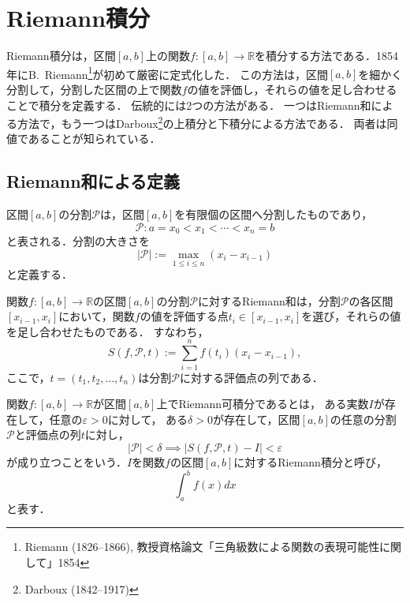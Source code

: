 \chapter{Riemann積分}


Riemann積分は，区間$[a,b]$上の関数$f : [a,b] \to \mathbb{R}$を積分する方法である．1854年にB.~Riemann\footnote{Riemann (1826--1866), 教授資格論文「三角級数による関数の表現可能性に関して」1854}が初めて厳密に定式化した．
この方法は，区間$[a,b]$を細かく分割して，分割した区間の上で関数$f$の値を評価し，それらの値を足し合わせることで積分を定義する．
伝統的には2つの方法がある．
一つはRiemann和による方法で，もう一つはDarboux\footnote{Darboux (1842--1917)}の上積分と下積分による方法である．
両者は同値であることが知られている．

\section{Riemann和による定義}
\begin{definition}[区間の分割]
    区間$[a,b]$の分割$\mathcal{P}$は，区間$[a,b]$を有限個の区間へ分割したものであり，
    \[
    \mathcal{P} : a = x_0 < x_1 < \cdots < x_n = b
    \]
    と表される．分割の大きさを
    \[ |\mathcal{P}| := \max_{1 \leq i \leq n} (x_i - x_{i-1})\]
    と定義する．
\end{definition}

\begin{definition}[Riemann和]
    関数$f : [a,b] \to \mathbb{R}$の区間$[a,b]$の分割$\mathcal{P}$に対するRiemann和は，分割$\mathcal{P}$の各区間$[x_{i-1}, x_i]$において，関数$f$の値を評価する点$t_i \in [x_{i-1}, x_i]$を選び，それらの値を足し合わせたものである．
    すなわち，
    \[
        S(f,\mathcal{P},t) := \sum_{i=1}^n f(t_i)(x_i - x_{i-1}),
    \]
    ここで，$t = (t_1, t_2, \ldots, t_n)$は分割$\mathcal{P}$に対する評価点の列である．    
\end{definition}

\begin{definition}[Riemann可積分]
    関数$f : [a,b] \to \mathbb{R}$が区間$[a,b]$上でRiemann可積分であるとは，
    ある実数$I$が存在して，任意の$\varepsilon > 0$に対して，
    ある$\delta > 0$が存在して，区間$[a,b]$の任意の分割$\mathcal{P}$と評価点の列$t$に対し，
    \[
        |\mathcal P| < \delta \implies |S(f,\mathcal{P},t) - I| < \varepsilon
    \]
    が成り立つことをいう．$I$を関数$f$の区間$[a,b]$に対するRiemann積分と呼び，\[\int_a^b f(x) dx\]と表す．
\end{definition}

